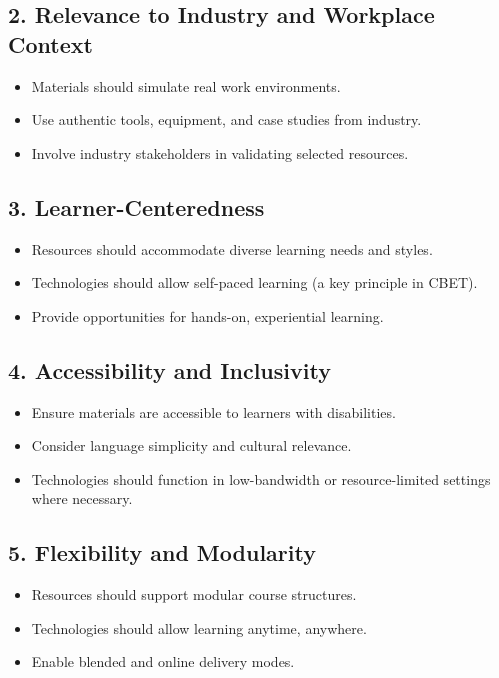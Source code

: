 \documentclass[12pt,a4paper]{article}
\begin{document}
\subsection*{2. Relevance to Industry and Workplace Context}
\begin{itemize}
    \item Materials should simulate real work environments.
    \item Use authentic tools, equipment, and case studies from industry.
    \item Involve industry stakeholders in validating selected resources.
\end{itemize}

\subsection*{3. Learner-Centeredness}
\begin{itemize}
    \item Resources should accommodate diverse learning needs and styles.
    \item Technologies should allow self-paced learning (a key principle in CBET).
    \item Provide opportunities for hands-on, experiential learning.
\end{itemize}

\subsection*{4. Accessibility and Inclusivity}
\begin{itemize}
    \item Ensure materials are accessible to learners with disabilities.
    \item Consider language simplicity and cultural relevance.
    \item Technologies should function in low-bandwidth or resource-limited settings where necessary.
\end{itemize}

\subsection*{5. Flexibility and Modularity}
\begin{itemize}
    \item Resources should support modular course structures.
    \item Technologies should allow learning anytime, anywhere.
    \item Enable blended and online delivery modes.
\end{itemize}
\end{document}
